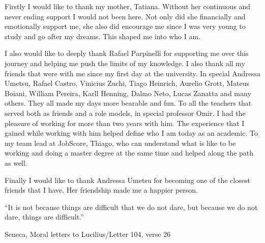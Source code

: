 \begin{agradecimentos}
  Firstly I would like to thank my mother, Tatiana. Without her continuous and never ending support
  I would not been here. Not only did she financially and emotionally support me, she also
  did encourage me since I was very young to study and go after my dreams. This shaped me
  into who I am.

  I also would like to deeply thank Rafael Parpinelli for supporting me over this journey
  and helping me push the limits of my knowledge. I also thank all my friends that were with
  me since my first day at the university. In special Andressa Umetsu, Rafael Castro, Vinicius Zuchi,
  Tiago Heinrich,
  Aurelio Grott, Mateus Boiani, William Pereira, Karll Henning, Dalmo Neto, Lucas Zanatta and many others.
  They all made my days more bearable and fun.
  To all the teachers that served both as friends and a role models,
  in special professor Omir. I had the pleasure of working for more than two years with him.
  The experience that I gained while working with him helped define who I am today as an academic.
  To my team lead at JobScore, Thiago, who can understand what is like to be working and doing a master
  degree at the same time and helped along the path as well.

  Finally I would like to thank Andressa Umetsu for becoming one of the closest friends that
  I have. Her friendship made me a happier person.
\end{agradecimentos}

\begin{epigrafe}
  ``It is not because things are difficult that we do not dare, but because we do not dare, things are difficult.''
  \\
  \par
  Seneca, Moral letters to Lucilius/Letter 104, verse 26
\end{epigrafe}




